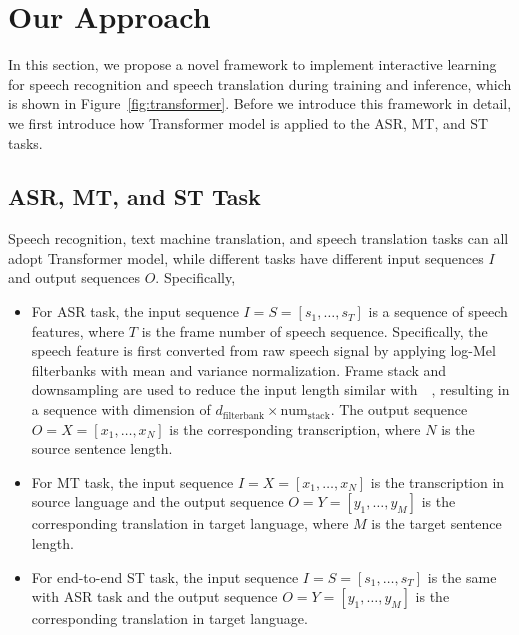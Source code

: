 \documentclass[letterpaper]{article} %
\begin{document}
\section{Our Approach}
In this section, we propose a novel framework to implement interactive learning for speech recognition and speech translation during training and inference, which is shown in Figure~\ref{fig:transformer}. Before we introduce this framework in detail, we first introduce how Transformer model is applied to the ASR, MT, and ST tasks.

\subsection{ASR, MT, and ST Task}
Speech recognition, text machine translation, and speech translation tasks can all adopt Transformer model, while different tasks have different input sequences $\mathbf{\mathit{I}}$ and output sequences $\mathbf{\mathit{O}}$. Specifically,
\begin{itemize}
	\item For ASR task, the input sequence $\mathbf{\mathit{I}}=\mathbf{\mathit{S}}=[s_1,\dots,s_T]$ is a sequence of speech features, where $T$ is the frame number of speech sequence. Specifically, the speech feature is first converted from raw speech signal by applying log-Mel filterbanks with mean and variance normalization. Frame stack and downsampling are used  to reduce the input length similar with~\citeauthor{sak2015fast}~, resulting in a sequence with dimension of $d_{\textrm{filterbank}} \times \textrm{num}_{\textrm{stack}}$. 
	The output sequence $\mathbf{\mathit{O}}=\mathbf{\mathit{X}}=[x_1,\dots,x_N]$ is the corresponding transcription, where $N$ is the source sentence length.
	\item For  MT task, the input sequence $\mathbf{\mathit{I}}=\mathbf{\mathit{X}}=[x_1,\dots,x_N]$ is  the transcription in source language and the output sequence $\mathbf{\mathit{O}}=\mathbf{\mathit{Y}}=[y_1,\dots,y_M]$ is the corresponding translation in target language, where $M$ is the target sentence length.
	\item For end-to-end ST task, the input sequence $\mathbf{\mathit{I}}=\mathbf{\mathit{S}}=[s_1,\dots,s_T]$ is the same with ASR task and the output sequence $\mathbf{\mathit{O}}=\mathbf{\mathit{Y}}=[y_1,\dots,y_M]$ is the corresponding translation in target language.
\end{itemize}
\end{document}
